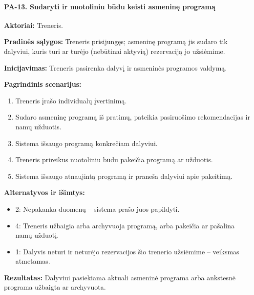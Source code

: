 \paragraph{PA-13. Sudaryti ir nuotoliniu būdu keisti asmeninę programą}\mbox{}\par
\textbf{Aktoriai:} Treneris.\par
\textbf{Pradinės sąlygos:} Treneris prisijungęs; asmeninę programą jis sudaro tik dalyviui, kuris turi ar turėjo (nebūtinai aktyvią) rezervaciją jo užsiėmime.\par
\textbf{Inicijavimas:} Treneris pasirenka dalyvį ir asmeninės programos valdymą.\par
\textbf{Pagrindinis scenarijus:}
\begin{enumerate}
\item Treneris įrašo individualų įvertinimą.
\item Sudaro asmeninę programą iš pratimų, pateikia pasiruošimo rekomendacijas ir namų užduotis.
\item Sistema išsaugo programą konkrečiam dalyviui.
\item Treneris prireikus nuotoliniu būdu pakeičia programą ar užduotis.
\item Sistema išsaugo atnaujintą programą ir praneša dalyviui apie pakeitimą.
\end{enumerate}
\textbf{Alternatyvos ir išimtys:}
\begin{itemize}
\item 2: Nepakanka duomenų -- sistema prašo juos papildyti.
\item 4: Treneris užbaigia arba archyvuoja programą, arba pakeičia ar pašalina namų užduotį.
\item 1: Dalyvis neturi ir neturėjo rezervacijos šio trenerio užsiėmime -- veiksmas atmetamas.
\end{itemize}
\textbf{Rezultatas:} Dalyviui pasiekiama aktuali asmeninė programa arba ankstesnė programa užbaigta ar archyvuota.\par
{}
